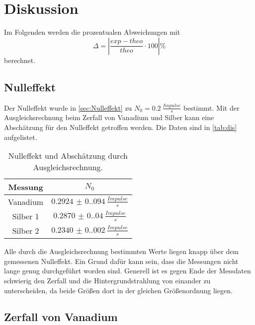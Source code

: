 \section{Diskussion}
\label{sec:Diskussion}
Im Folgenden werden die prozentualen Abweichungen mit 
\begin{equation}\label{eq:1}
    \Delta = |\frac{exp - theo}{theo} \cdot 100|\%
\end{equation}
berechnet.
\subsection{Nulleffekt}
Der Nulleffekt wurde in \autoref{sec:Nulleffekt} zu $N_0 = \SI{0.2}{\frac{Impulse}{s}}$ bestimmt. 
Mit der Ausgleichsrechnung beim Zerfall von Vanadium und Silber kann eine Abschätzung für den Nulleffekt getroffen werden. Die Daten sind in \autoref{tab:dis} 
aufgelistet.

\begin{table}[H]
    \centering
    \caption{Nulleffekt und Abschätzung durch Ausgleichsrechnung.}
    \begin{tabular}{c c}
        \toprule
        {Messung} & {$N_0$}\\
        \midrule
        Vanadium & $\SI{0.2924(0.094)}{\frac{Impulse}{s}}$\\
        Silber 1 & $\SI{0.2870(0.040)}{\frac{Impulse}{s}}$\\
        Silber 2 & $\SI{0.2340(0.002)}{\frac{Impulse}{s}}$\\
        \bottomrule
    \end{tabular}
    \label{tab:dis}
\end{table}

Alle durch die Ausgleichsrechnung bestimmten Werte liegen knapp über dem gemessenen Nulleffekt.
Ein Grund dafür kann sein, dass die Messungen nicht lange genug durchgeführt worden sind. Generell ist es gegen Ende 
der Messdaten schwierig den Zerfall und die Hintergrundstrahlung von einander zu unterscheiden, da beide Größen dort 
in der gleichen Größenordnung liegen.

\subsection{Zerfall von Vanadium}
